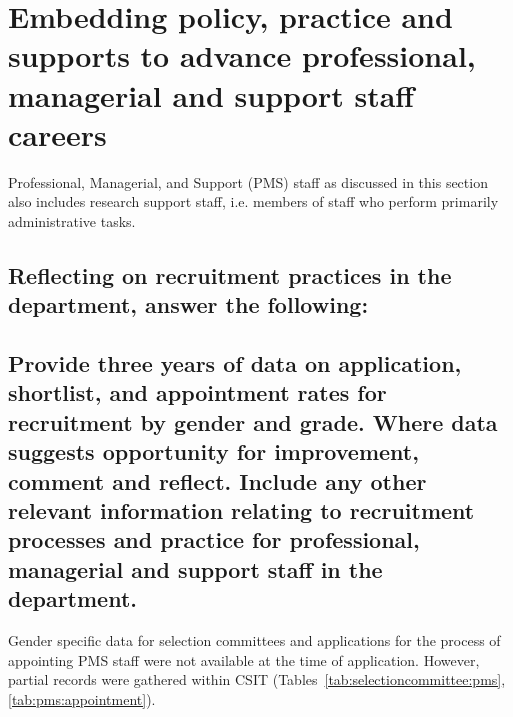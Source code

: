 
\newpage 
\section{Embedding policy, practice and supports to advance professional, managerial and support staff careers}
\label{sec:pms}

Professional, Managerial, and Support (PMS) staff as discussed in this section also includes research support staff, i.e. members of staff who perform primarily administrative tasks. 


\subsection{Reflecting on recruitment practices in the department, answer the following:}





\subsection{Provide three years of data on application, shortlist, and appointment rates for recruitment by gender and grade. Where data suggests opportunity for improvement, comment and reflect. Include any other relevant information relating to recruitment processes and practice for professional, managerial and support staff in the department.}



Gender specific data for selection committees and applications for the process of appointing PMS staff were not available at the time of application. However, partial records were gathered within CSIT (Tables~\ref{tab:selectioncommittee:pms}, \ref{tab:pms:appointment}). 



